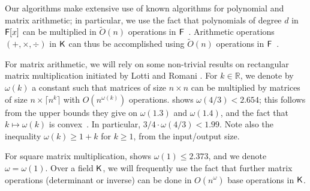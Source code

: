Our algorithms make extensive use of known algorithms for polynomial and matrix
arithmetic; in particular, we use the fact that polynomials of degree $d$
in ${\mathsf{F}}[x]$ can be multiplied in $\tilde{O}(n)$ operations in
${\mathsf{F}}$~\cite{ScSt71}. Arithmetic operations $(+,\times,\div)$ in ${\mathsf{K}}$ can
thus be accomplished using $\tilde{O}(n)$ operations in
${\mathsf{F}}$~\cite{vzGathen13}.

For matrix arithmetic, we will rely on some non-trivial results on
rectangular matrix multiplication initiated by Lotti and Romani . For
$k \in \mathbb{R}$, we denote by $\omega(k)$ a constant such that matrices
of size $n\times n$ can be multiplied by matrices of size
$n\times \lceil n^k \rceil$ with $O(n^{\omega(k)})$ operations. 
\cite{LeGall} shows $\omega(4/3) < 2.654$; this follows from the
upper bounds they give on $\omega(1.3)$ and $\omega(1.4)$,
and the fact that $k \mapsto \omega(k)$ is convex~\cite{LoRo83}. In
particular, $3/4 \cdot \omega(4/3) < 1.99$. Note also the inequality
$\omega(k) \ge 1+k$ for $k\ge 1$, from the input/output size.

For square matrix multiplication, \cite{LeGall14} shows
$\omega(1) \le 2.373$, and we denote $\omega=\omega(1)$.  Over a field
${\mathsf{K}}$, we will frequently use the fact that further matrix operations
(determinant or inverse) can be done in $O(n^\omega)$ base operations in
${\mathsf{K}}$.


